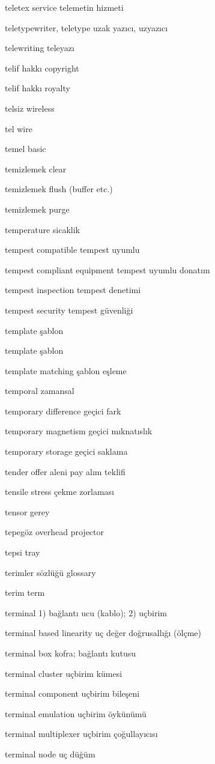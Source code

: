 \documentclass[12pt,fleqn]{article}\usepackage{../../common}
\begin{document}
teletex service telemetin hizmeti

teletypewriter, teletype uzak yazıcı, uzyazıcı

telewriting teleyazı

telif hakkı copyright

telif hakkı royalty

telsiz wireless

tel wire

temel basic

temizlemek clear

temizlemek flush (buffer etc.)

temizlemek purge

temperature sicaklik

tempest compatible tempest uyumlu

tempest compliant equipment tempest uyumlu donatım

tempest inspection tempest denetimi

tempest security tempest güvenliği

template şablon

template şablon

template matching şablon eşleme

temporal zamansal

temporary difference geçici fark

temporary magnetism geçici mıknatıslık

temporary storage geçici saklama

tender offer aleni pay alım teklifi

tensile stress çekme zorlaması

tensor gerey

tepegöz overhead projector

tepsi tray

terimler sözlüğü glossary

terim term

terminal 1) bağlantı ucu (kablo); 2) uçbirim

terminal based linearity uç değer doğrusallığı (ölçme)

terminal box kofra; bağlantı kutusu

terminal cluster uçbirim kümesi

terminal component uçbirim bileşeni

terminal emulation uçbirim öykünümü

terminal multiplexer uçbirim çoğullayıcısı

terminal node uç düğüm
\end{document}
